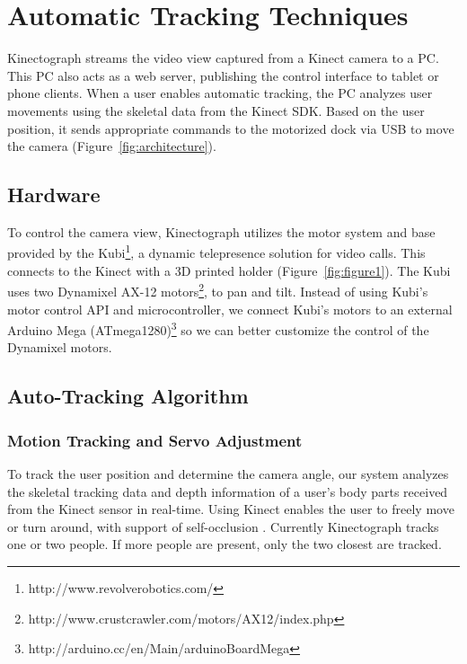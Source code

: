 \section{Automatic Tracking Techniques}
\label{kinectograph_tracking}

Kinectograph streams the video view captured from a Kinect camera to a PC. This PC also acts as a web server, publishing the control interface to tablet or phone clients. When a user enables automatic tracking, the PC analyzes user movements using the skeletal data from the Kinect SDK. Based on the user position, it sends appropriate commands to the motorized dock via USB to move the camera (Figure~\ref{fig:architecture}).

\subsection{Hardware}
To control the camera view, Kinectograph utilizes the motor system and base provided by the Kubi\footnote{http://www.revolverobotics.com/}, a dynamic telepresence solution for video calls. This connects to the Kinect with a 3D printed holder (Figure~\ref{fig:figure1}). The Kubi uses two Dynamixel AX-12 motors\footnote{http://www.crustcrawler.com/motors/AX12/index.php}, to pan and tilt. Instead of using Kubi's motor control API and microcontroller, we connect Kubi's motors to an external Arduino Mega (ATmega1280)\footnote{http://arduino.cc/en/Main/arduinoBoardMega} so we can better customize the control of the Dynamixel motors.

\subsection{Auto-Tracking Algorithm}

\subsubsection{Motion Tracking and Servo Adjustment}
To track the user position and determine the camera angle, our system analyzes the skeletal tracking data and depth information of a user’s body parts received from the Kinect sensor in real-time. Using Kinect enables the user to freely move or turn around, with support of self-occlusion \cite{Shotton:2011ud}. Currently Kinectograph tracks one or two people. If more people are present, only the two closest are tracked.

